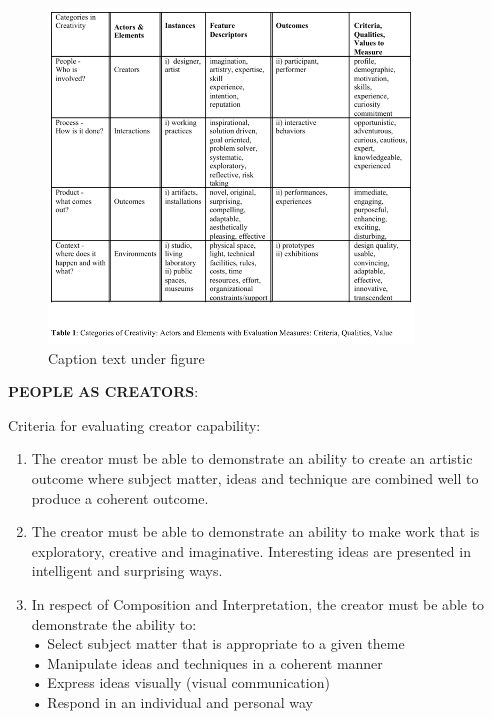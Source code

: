 \begin{figure}[htb] %
  \centering
  \includegraphics[width=\linewidth]{images/candy01.png}
\caption[Text for Table of Contents]{Caption text under figure}
\label{fig:candy01}
\end{figure}

\textbf{PEOPLE AS CREATORS}: \citep[p.14-15]{Candy2012}

Criteria for evaluating creator capability:
\begin{enumerate}
  \item The creator must be able to demonstrate an ability to create an artistic outcome where subject matter, ideas and technique are combined well to produce a coherent outcome.
  \item The creator must be able to demonstrate an ability to make work that is exploratory, creative and imaginative. Interesting ideas are presented in intelligent and surprising ways.
  \item In respect of Composition and Interpretation, the creator must be able to demonstrate the ability to:\\
  •	Select subject matter that is appropriate to a given theme\\
  •	Manipulate ideas and techniques in a coherent manner\\
  •	Express ideas visually (visual communication)\\
  •	Respond in an individual and personal way
\end{enumerate}

